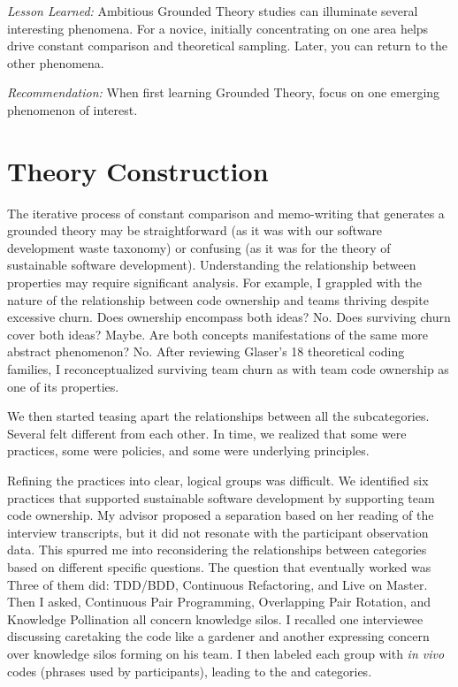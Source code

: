 \textit{Lesson Learned:} Ambitious Grounded Theory studies can illuminate several interesting phenomena. For a novice, initially concentrating on one area helps drive constant comparison and theoretical sampling. Later, you can return to the other phenomena.

\textit{Recommendation:} When first learning Grounded Theory, focus on one emerging phenomenon of interest. 
\section{Theory Construction}
\label{TheoryConstruction}

The iterative process of constant comparison and memo-writing that generates a grounded theory may be straightforward (as it was with our software development waste taxonomy) or confusing (as it was for the theory of sustainable software development). Understanding the relationship between properties may require significant analysis. For example, I grappled with the nature of the relationship between code ownership and teams thriving despite excessive churn. Does ownership encompass both ideas? No. Does surviving churn cover both ideas? Maybe. Are both concepts manifestations of the same more abstract phenomenon? No. After reviewing Glaser's 18 theoretical coding families, I reconceptualized surviving team churn as  with team code ownership as one of its properties. 

We then started teasing apart the relationships between all the subcategories. Several felt different from each other. In time, we realized that some were practices, some were policies, and some were underlying principles. 

Refining the practices into clear, logical groups was difficult. We identified six practices that supported sustainable software development by supporting team code ownership. My advisor proposed a separation based on her reading of the interview transcripts, but it did not resonate with the participant observation data. This spurred me into reconsidering the relationships between categories based on different specific questions. The question that eventually worked was  Three of them did: TDD/BDD, Continuous Refactoring, and Live on Master. Then I asked,  Continuous Pair Programming, Overlapping Pair Rotation, and Knowledge Pollination all concern knowledge silos. I recalled one interviewee discussing caretaking the code like a gardener and another expressing concern over knowledge silos forming on his team. I then labeled each group with \textit{in vivo} codes (phrases used by participants), leading to the  and  categories. 

